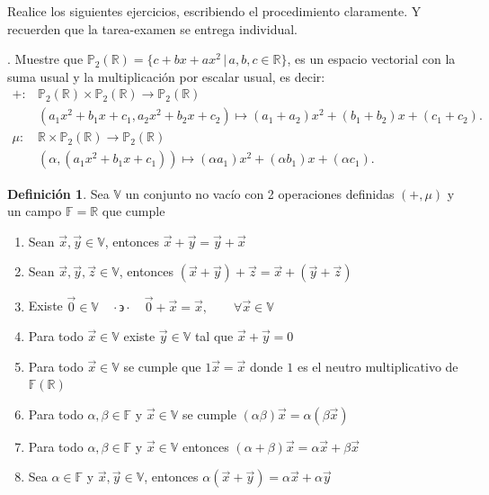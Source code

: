 \documentclass[letterpaper]{article}
\newcommand{\V}{\mathds{V}}
\newcommand{\F}{\mathds{F}}
\newcommand{\tq}{ \quad \cdot  \backepsilon \cdot \quad }
\newcommand{\R}{\mathds{R}}
\renewcommand{\*}{\cdot}
\theoremstyle{definition}
\newtheorem{definition}{Definición}
\begin{document}
\vspace{0.5cm}
\noindent Realice los siguientes ejercicios, escribiendo el procedimiento claramente. Y recuerden que la tarea-examen se entrega individual. 

. Muestre que $\mathbb{P}_{2}(\mathbb{R}) = \{ c  + bx + ax^2  \,  \vert \, a,b,c \in \mathbb{R} \}$, es un espacio vectorial con la suma usual y la multiplicación por escalar usual, es decir:
\begin{align*}
     + \colon & \mathbb{P}_{2}(\mathbb{R}) \times \mathbb{P}_{2}(\mathbb{R}) \longrightarrow \mathbb{P}_{2}(\mathbb{R}) \\
    & (a_1 x^2 + b_1x + c_1 , a_2 x^2 + b_2x + c_2) \mapsto  (a_1 + a_2)x^2 + (b_1 + b_2)x + (c_1 + c_2). \\
    \mu \colon & \mathbb{R} \times \mathbb{P}_{2}(\mathbb{R}) \longrightarrow \mathbb{P}_{2}(\mathbb{R}) \\
    & (\alpha, (a_1 x^2 + b_1x + c_1)) \mapsto  (\alpha a_1)x^2 + (\alpha b_1)x + (\alpha c_1).
 \end{align*}
\begin{definition}
	Sea $ \V $ un conjunto no vacío con 2 operaciones definidas $ (+,\mu) $ y un campo $ \F = \R $ que cumple
	\begin{enumerate}
		\item Sean $ \vec{x}, \vec{y} \in \V $, entonces $ \vec{x} + \vec{y} = \vec{y} + \vec{x} $
		\item Sean $ \vec{x}, \vec{y}, \vec{z} \in \V $, entonces
		$ (\vec{x} + \vec{y}) + \vec{z} = \vec{x} + (\vec{y} + \vec{z}) $
		\item Existe $ \vec{0} \in \V \tq \vec{0} + \vec{x} = \vec{x}, \qquad \forall \vec{x} \in \V$
		\item Para todo $ \vec{x} \in \V $ existe $ \vec{y} \in \V $ tal que $ \vec{x} + \vec{y} = 0 $
		\item Para todo $ \vec{x} \in \V $ se cumple que $ 1\vec{x} = \vec{x} $ donde $ 1 $ es el neutro multiplicativo de $ \F(\R) $
		\item Para todo $ \alpha, \beta \in \F $ y $ \vec{x} \in \V $ se cumple $ (\alpha\beta)\vec{x} = \alpha(\beta \vec{x}) $
		\item Para todo $ \alpha, \beta  \in \F$ y $ \vec{x} \in \V $ entonces $ (\alpha + \beta)\vec{x} = \alpha\vec{x} + \beta\vec{x} $
		\item Sea $ \alpha \in \F $ y $ \vec{x}, \vec{y} \in \V $, entonces $ \alpha(\vec{x} + \vec{y}) = \alpha\vec{x} + \alpha\vec{y} $
	\end{enumerate}
\end{definition}
\end{document}
